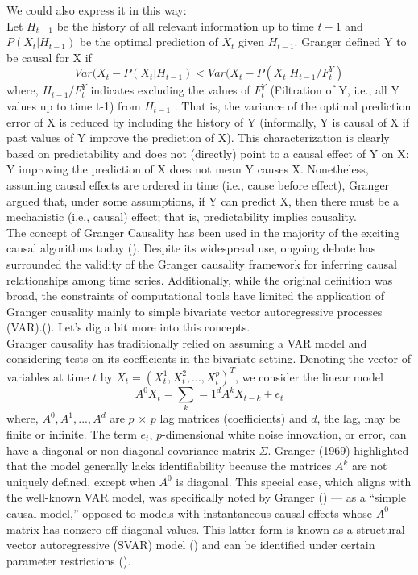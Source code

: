We could also express it in this way:\\
Let $H_{t-1}$ be the history of all relevant information up to time $t-1$ and $P(X_t | H_{t-1})$ be the optimal prediction of $X_t$ given $H_{t-1}$. Granger defined Y to be causal for X if
$$Var(X_t − P(X_t | H_{t-1}) < Var(X_t − P(X_t | H_{t-1}/F^Y_t)$$
where, $H_{t-1}/F^Y_t$ indicates excluding the values of $F^Y_t$ (Filtration of Y, i.e., all Y values up to time t-1) from $H_{t-1}$ . That is, the variance of the optimal prediction error of X is reduced by including the history of Y (informally, Y is causal of X if past values of Y improve the prediction of X). This characterization is clearly based on predictability
and does not (directly) point to a causal effect of Y on X: Y improving the prediction of X does not mean Y causes X. Nonetheless, assuming causal effects are ordered in time (i.e., cause before effect), Granger argued that, under some assumptions, if Y can predict X, then there must be a mechanistic
(i.e., causal) effect; that is, predictability implies causality. \cite{shojaie2022granger}\\

The concept of Granger Causality has been used in the majority of the exciting causal algorithms today (\cite{guo2020survey}). Despite its widespread use, ongoing debate has surrounded the validity of the Granger causality framework for inferring causal relationships among time series. Additionally, while the original definition was broad, the constraints of computational tools have limited the application of Granger causality mainly to simple bivariate vector autoregressive processes (VAR).(\cite{shojaie2022granger}). Let's dig a bit more into this concepts.\\

Granger causality has traditionally relied on assuming a VAR model and considering tests on its coefficients in the bivariate setting.
Denoting the vector of variables at time $t$ by $X_t = (X^1_t , X^2_t , ..., X^p_t)^T$, we consider the linear model $$A^0X_t = \sum_k = 1^d A^kX_{t−k} + e_t$$ where, $A^0, A^1, ..., A^d$ are $p$ × $p$ lag matrices (coefficients) and $d$, the lag, may be finite or infinite. The term $e_t$, $p$-dimensional white noise innovation, or error, can have a diagonal or non-diagonal covariance matrix $\Sigma$. Granger (1969) highlighted that the model generally lacks identifiability because the matrices $A^k$ are not uniquely defined, except when $A^0$ is diagonal. This special case, which aligns with the well-known VAR model, was specifically noted by Granger (\cite{lutkepohl2005new}) — as a “simple causal model,” opposed to models with instantaneous causal effects whose $A^0$ matrix has nonzero off-diagonal values. This latter form is known as a structural vector autoregressive (SVAR) model (\cite{kilian2013structural}) and can be identified under certain parameter restrictions (\cite{kilian2017structural}).\\


